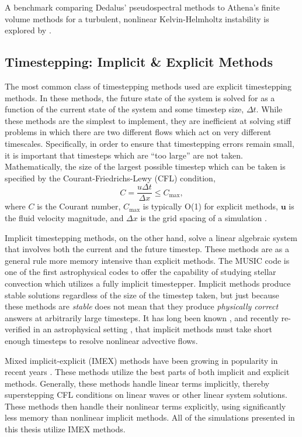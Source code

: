 A benchmark comparing Dedalus' pseudospectral methods to Athena's finite volume methods for a turbulent, nonlinear Kelvin-Helmholtz instability is explored by \citet{Lecoanet_et_al_2016_KH}.


\subsection{Timestepping: Implicit \& Explicit Methods}
\label{sct:intro_timestepping}
The most common class of timestepping methods used are explicit timestepping methods.
In these methods, the future state of the system is solved for as a function of the current state of the system and some timestep size, $\Delta t$.
While these methods are the simplest to implement, they are inefficient at solving stiff problems in which there are two different flows which act on very different timescales.
Specifically, in order to ensure that timestepping errors remain small, it is important that timesteps which are ``too large'' are not taken.
Mathematically, the size of the largest possible timestep which can be taken is specified by the Courant-Friedrichs-Lewy (CFL) condition,
\begin{equation}
C = \frac{u \Delta t}{\Delta x} \leq C_{\text{max}},
\end{equation}
where $C$ is the Courant number, $C_{\text{max}}$ is typically O(1) for explicit methods, $\bm{u}$ is the fluid velocity magnitude, and $\Delta x$ is the grid spacing of a simulation \citep{cfl1967}.

Implicit timestepping methods, on the other hand, solve a linear algebraic system that involves both the current and the future timestep.
These methods are as a general rule more memory intensive than explicit methods.
The MUSIC code is one of the first astrophysical codes to offer the capability of studying stellar convection which utilizes a fully implicit timestepper.
Implicit methods produce stable solutions regardless of the size of the timestep taken, but just because these methods are \emph{stable} does not mean that they produce \emph{physically correct} answers at arbitrarily large timesteps.
It has long been known \citep[e.g., per the discussion in Ch.~11.1 of][]{oran&boris1987}, and recently re-verified in an astrophysical setting \citep{viallet&all2011, viallet&all2013, viallet&all2016}, that implicit methods must take short enough timesteps to resolve nonlinear advective flows.

Mixed implicit-explicit (IMEX) methods have been growing in popularity in recent years \citep[see e.g.,][and citations to that work]{ascher&all1995}.
These methods utilize the best parts of both implicit and explicit methods.
Generally, these methods handle linear terms implicitly, thereby superstepping CFL conditions on linear waves or other linear system solutions.
These methods then handle their nonlinear terms explicitly, using significantly less memory than nonlinear implicit methods.
All of the simulations presented in this thesis utilize IMEX methods.



